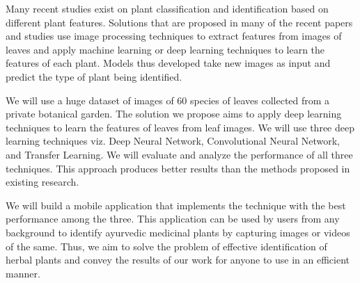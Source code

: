 Many recent studies exist on plant classification and identification based on different plant features. Solutions that are proposed in many of the recent papers and studies use image processing techniques to extract features from images of leaves and apply machine learning or deep learning techniques to learn the features of each plant. Models thus developed take new images as input and predict the type of plant being identified.

We will use a huge dataset of images of 60 species of leaves collected from a private botanical garden. The solution we propose aims to apply deep learning techniques to learn the features of leaves from leaf images. We will use three deep learning techniques viz. Deep Neural Network, Convolutional Neural Network, and Transfer Learning. We will evaluate and analyze the performance of all three techniques. This approach produces better results than the methods proposed in existing research.
 
We will build a mobile application that implements the technique with the best performance among the three. This application can be used by users from any background to identify ayurvedic medicinal plants by capturing images or videos of the same. Thus, we aim to solve the problem of effective identification of herbal plants and convey the results of our work for anyone to use in an efficient manner.


